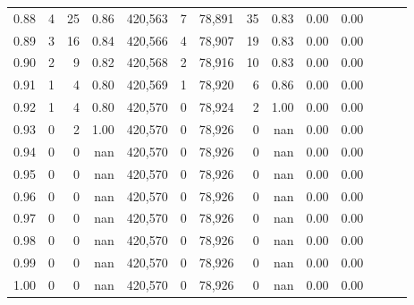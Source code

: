 \begin{tabular}{rrrrrrrrrrrrrr}
0.88 &       4 &     25 &  0.86 &  420,563 &        7 &  78,891 &      35 &  0.83 &  0.00 &      0.00 \\
0.89 &       3 &     16 &  0.84 &  420,566 &        4 &  78,907 &      19 &  0.83 &  0.00 &      0.00 \\
0.90 &       2 &      9 &  0.82 &  420,568 &        2 &  78,916 &      10 &  0.83 &  0.00 &      0.00 \\
0.91 &       1 &      4 &  0.80 &  420,569 &        1 &  78,920 &       6 &  0.86 &  0.00 &      0.00 \\
0.92 &       1 &      4 &  0.80 &  420,570 &        0 &  78,924 &       2 &  1.00 &  0.00 &      0.00 \\
0.93 &       0 &      2 &  1.00 &  420,570 &        0 &  78,926 &       0 &   nan &  0.00 &      0.00 \\
0.94 &       0 &      0 &   nan &  420,570 &        0 &  78,926 &       0 &   nan &  0.00 &      0.00 \\
0.95 &       0 &      0 &   nan &  420,570 &        0 &  78,926 &       0 &   nan &  0.00 &      0.00 \\
0.96 &       0 &      0 &   nan &  420,570 &        0 &  78,926 &       0 &   nan &  0.00 &      0.00 \\
0.97 &       0 &      0 &   nan &  420,570 &        0 &  78,926 &       0 &   nan &  0.00 &      0.00 \\
0.98 &       0 &      0 &   nan &  420,570 &        0 &  78,926 &       0 &   nan &  0.00 &      0.00 \\
0.99 &       0 &      0 &   nan &  420,570 &        0 &  78,926 &       0 &   nan &  0.00 &      0.00 \\
1.00 &       0 &      0 &   nan &  420,570 &        0 &  78,926 &       0 &   nan &  0.00 &      0.00 \\
\bottomrule
\end{tabular}

